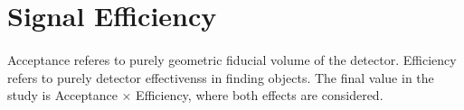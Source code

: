 \section{Signal Efficiency}

\paragraph{}
Acceptance referes to purely geometric fiducial volume of the detector. Efficiency refers to purely detector effectivenss in finding objects. The final value in the study is Acceptance $\times$ Efficiency, where both effects are considered.

















